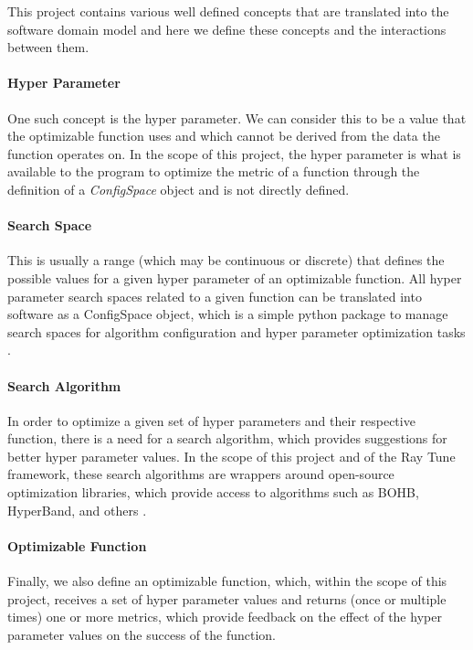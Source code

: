 This project contains various well defined concepts that are translated into the software domain model and here we define these concepts and the interactions between them.

\paragraph{Hyper Parameter}

One such concept is the hyper parameter. We can consider this to be a value that the optimizable function uses and which cannot be derived from the data the function operates on. In the scope of this project, the hyper parameter is what is available to the program to optimize the metric of a function through the definition of a \textit{ConfigSpace} object and is not directly defined. 

\paragraph{Search Space}

This is usually a range (which may be continuous or discrete) that defines the possible values for a given hyper parameter of an optimizable function. All hyper parameter search spaces related to a given function can be translated into software as a ConfigSpace object, which is a simple python package to manage search spaces for algorithm configuration and hyper parameter optimization tasks \parencite{BOAH}.

\paragraph{Search Algorithm}

In order to optimize a given set of hyper parameters and their respective function, there is a need for a search algorithm, which provides suggestions for better hyper parameter values. In the scope of this project and of the Ray Tune framework, these search algorithms are wrappers around open-source optimization libraries, which provide access to algorithms such as BOHB, HyperBand, and others \parencite{ray}.

\paragraph{Optimizable Function}

Finally, we also define an optimizable function, which, within the scope of this project, receives a set of hyper parameter values and returns (once or multiple times) one or more metrics, which provide feedback on the effect of the hyper parameter values on the success of the function.

